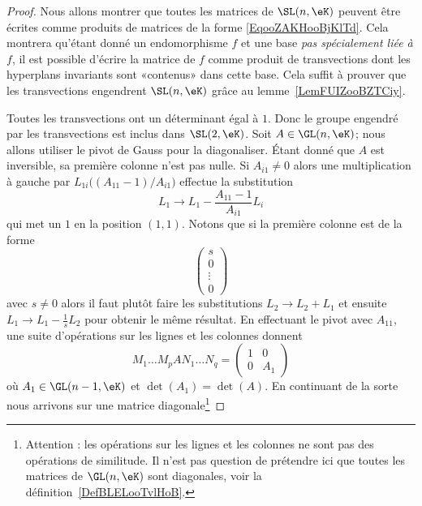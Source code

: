 \begin{proof}
	Nous allons montrer que toutes les matrices de \( \SL(n,\eK)\) peuvent être écrites comme produits de matrices de la forme \eqref{EqooZAKHooBjKlTd}. Cela montrera qu'étant donné un endomorphisme \( f\) et une base \emph{pas spécialement liée à \( f\)}, il est possible d'écrire la matrice de \( f\) comme produit de transvections dont les hyperplans invariants sont «contenus» dans cette base. Cela suffit à prouver que les transvections engendrent \( \SL(n,\eK)\) grâce au lemme~\ref{LemFUIZooBZTCiy}.

	Toutes les transvections ont un déterminant égal à \( 1\). Donc le groupe engendré par les transvections est inclus dans \( \SL(2,\eK)\). Soit \( A\in\GL(n,\eK)\); nous allons utiliser le pivot de Gauss pour la diagonaliser. Étant donné que \( A\) est inversible, sa première colonne n'est pas nulle. Si \( A_{i1}\neq 0\) alors une multiplication à gauche par \( L_{1i}\big(   (A_{11}-1)/A_{i1}  \big)\) effectue la substitution
	\begin{equation}
		L_1\to L_1-\frac{ A_{11}-1 }{ A_{i1} }L_i
	\end{equation}
	qui met un \( 1\) en la position \( (1,1)\). Notons que si la première colonne est de la forme
	\begin{equation}
		\begin{pmatrix}
			s      \\
			0      \\
			\vdots \\
			0
		\end{pmatrix}
	\end{equation}
	avec \( s\neq 0\) alors il faut plutôt faire les substitutions \( L_2\to L_2+L_1\) et ensuite \( L_1\to L_1-\frac{1}{ s }L_2\) pour obtenir le même résultat. En effectuant le pivot avec \( A_{11}\), une suite d'opérations sur les lignes et les colonnes donnent
	\begin{equation}
		M_1\ldots M_pAN_1\ldots N_q=\begin{pmatrix}
			1 & 0   \\
			0 & A_1
		\end{pmatrix}
	\end{equation}
	où \( A_1\in\GL(n-1,\eK)\) et \( \det(A_1)=\det(A)\). En continuant de la sorte nous arrivons sur une matrice diagonale\footnote{Attention : les opérations sur les lignes et les colonnes ne sont pas des opérations de similitude. Il n'est pas question de prétendre ici que toutes les matrices de \( \GL(n,\eK)\) sont diagonales, voir la définition~\ref{DefBLELooTvlHoB}.}

\end{proof}
